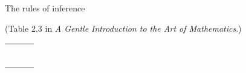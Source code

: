 \documentclass{article}
\begin{document}
\thispagestyle{empty}

\centerline{\Large The rules of inference}
\centerline{(Table 2.3 in {\em A Gentle Introduction to the Art of Mathematics}.)}

\vspace{.5in}

\begin{tabular}{ccc}

 & \rule{1in}{0in} & 

\\
\end{tabular}
\end{document}

